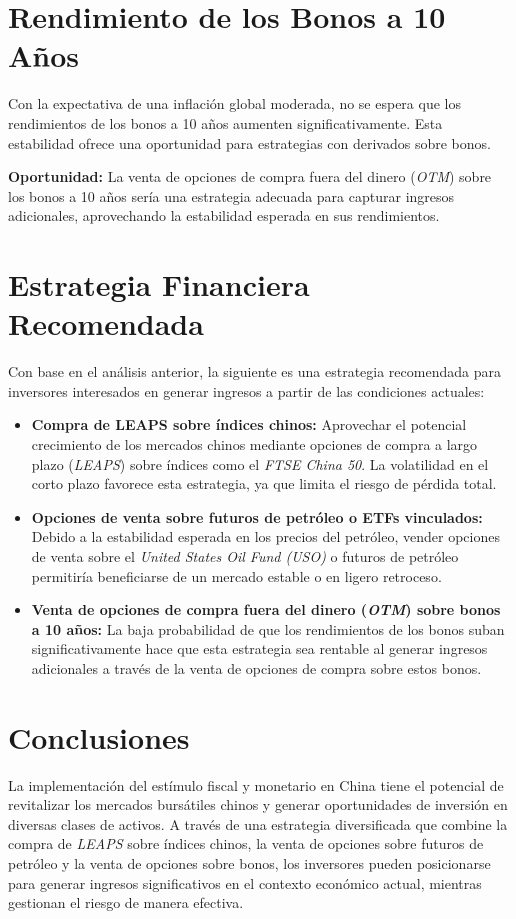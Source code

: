 \documentclass{article}
\begin{document}
\section*{Rendimiento de los Bonos a 10 Años}

Con la expectativa de una inflación global moderada, no se espera que los rendimientos de los bonos a 10 años aumenten significativamente. Esta estabilidad ofrece una oportunidad para estrategias con derivados sobre bonos.

\textbf{Oportunidad:} La venta de opciones de compra fuera del dinero (\emph{OTM}) sobre los bonos a 10 años sería una estrategia adecuada para capturar ingresos adicionales, aprovechando la estabilidad esperada en sus rendimientos.

\section*{Estrategia Financiera Recomendada}

Con base en el análisis anterior, la siguiente es una estrategia recomendada para inversores interesados en generar ingresos a partir de las condiciones actuales:

\begin{itemize}
    \item \textbf{Compra de LEAPS sobre índices chinos:} Aprovechar el potencial crecimiento de los mercados chinos mediante opciones de compra a largo plazo (\emph{LEAPS}) sobre índices como el \emph{FTSE China 50}. La volatilidad en el corto plazo favorece esta estrategia, ya que limita el riesgo de pérdida total.
    \item \textbf{Opciones de venta sobre futuros de petróleo o ETFs vinculados:} Debido a la estabilidad esperada en los precios del petróleo, vender opciones de venta sobre el \emph{United States Oil Fund (USO)} o futuros de petróleo permitiría beneficiarse de un mercado estable o en ligero retroceso.
    \item \textbf{Venta de opciones de compra fuera del dinero (\emph{OTM}) sobre bonos a 10 años:} La baja probabilidad de que los rendimientos de los bonos suban significativamente hace que esta estrategia sea rentable al generar ingresos adicionales a través de la venta de opciones de compra sobre estos bonos.
\end{itemize}

\section*{Conclusiones}

La implementación del estímulo fiscal y monetario en China tiene el potencial de revitalizar los mercados bursátiles chinos y generar oportunidades de inversión en diversas clases de activos. A través de una estrategia diversificada que combine la compra de \emph{LEAPS} sobre índices chinos, la venta de opciones sobre futuros de petróleo y la venta de opciones sobre bonos, los inversores pueden posicionarse para generar ingresos significativos en el contexto económico actual, mientras gestionan el riesgo de manera efectiva.
\end{document}
